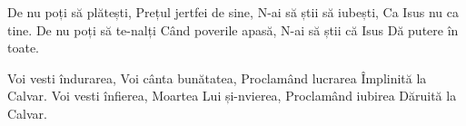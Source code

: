 
\beginverse
De nu poți să plătești,
Prețul jertfei de sine,
N-ai să știi să iubești,
Ca Isus nu ca tine.
De nu poți să te-nalți
Când poverile apasă,
N-ai să știi că Isus
Dă putere în toate.
\endverse

\beginchorus
Voi vesti îndurarea,
Voi cânta bunătatea,
Proclamând lucrarea
Împlinită la Calvar.
Voi vesti înfierea,
Moartea Lui și-nvierea,
Proclamând iubirea
Dăruită la Calvar.
\endchorus

\endsong